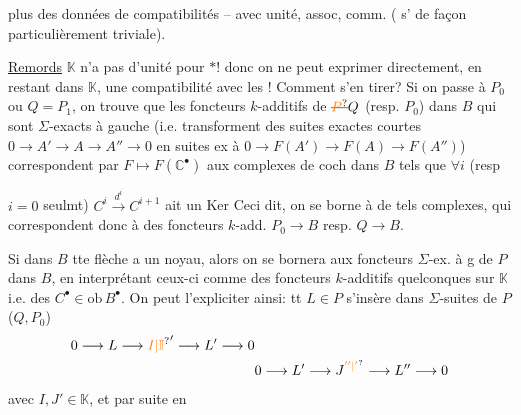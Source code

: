 plus des données de compatibilités -- avec unité, assoc, comm. ( s' de façon particulièrement triviale).

\uline{Remords} $\mathbb{K}$ n'a pas d'unité pour $*$! donc  on ne peut exprimer directement, en restant dans $\mathbb{K}$, une compatibilité avec les ! Comment s'en tirer? Si on passe à $P_0$ ou $Q=P_1$,  on trouve que les foncteurs $k$-additifs de $\deleted{\unsure{P}}Q$ (resp. $P_0$) dans $B$ qui sont $\Sigma$-exacts à gauche (i.e. transforment des \inserted{$\Sigma$-}suites exactes courtes $0\longrightarrow A'\longrightarrow A\longrightarrow A''\longrightarrow0$ en suites ex à $0\longrightarrow F(A')\longrightarrow F(A)\longrightarrow F(A'')$)  correspondent par $F\longmapsto F(\mathbb{C}^{\bullet})$ aux complexes de coch dans $B$ tels que $\forall i$ (resp 

$i=0$ seulmt) $C^i\xrightarrow{d^i}C^{i+1}$ ait un Ker  Ceci dit, on se borne à de tels complexes, qui correspondent donc à des foncteurs  $k$-add.  $P_0\longrightarrow B$ resp. $Q\longrightarrow B$. 

Si  dans $B$ tte flèche a un noyau, alors on se bornera aux foncteurs $\Sigma$-ex. à g de $P$ dans $B$, en  interprétant ceux-ci comme des foncteurs $k$-additifs quelconques sur $\mathbb{K}$ i.e. des $C^{\bullet}\in\mathrm{ob}\,B^{\bullet}$. On peut l'expliciter ainsi: tt $L\in P$   s'insère dans  $\Sigma$-suites de $P$ ($Q,P_0$)
\[
\begin{aligned}
0\longrightarrow L\longrightarrow \unsure{I|\mathbb I}'\longrightarrow L'\longrightarrow0&\\
&0\longrightarrow L'\longrightarrow J^{\unsure{''|'}}\longrightarrow L''\longrightarrow0
\end{aligned}
\]
avec $I,J'\in\mathbb{K}$, et par suite en

